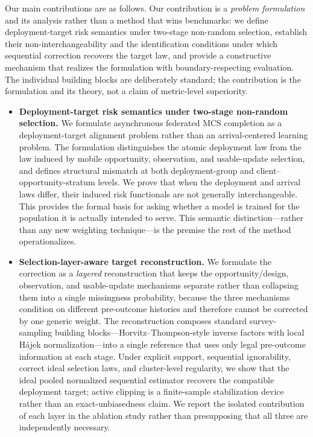 \documentclass[letterpaper,journal]{IEEEtran}
\begin{document}
Our main contributions are as follows.  Our contribution is a \emph{problem
formulation} and its analysis rather than a method that wins benchmarks: we
define deployment-target risk semantics under two-stage non-random selection,
establish their non-interchangeability and the identification conditions under
which sequential correction recovers the target law, and provide a
constructive mechanism that realizes the formulation with boundary-respecting
evaluation.  The individual building blocks are deliberately standard; the
contribution is the formulation and its theory, not a claim of metric-level
superiority.

\begin{itemize}
    \item \textbf{Deployment-target risk semantics under two-stage non-random
    selection.}
    We formulate asynchronous federated MCS completion as a
    deployment-target alignment problem rather than an arrival-centered
    learning problem.  The formulation distinguishes the atomic deployment law
    from the law induced by mobile opportunity, observation, and usable-update
    selection, and defines structural mismatch at both deployment-group and
    client--opportunity-stratum levels.  We prove that when the deployment and
    arrival laws differ, their induced risk functionals are not generally
    interchangeable.  This provides the formal basis for asking whether a model
    is trained for the population it is actually intended to serve.  This
    semantic distinction---rather than any new weighting technique---is the
    premise the rest of the method operationalizes.

    \item \textbf{Selection-layer-aware target reconstruction.}
    We formulate the correction as a \emph{layered} reconstruction that keeps the
    opportunity/design, observation, and usable-update mechanisms separate
    rather than collapsing them into a single missingness probability, because
    the three mechanisms condition on different pre-outcome histories and
    therefore cannot be corrected by one generic weight.  The reconstruction
    composes standard survey-sampling building blocks---Horvitz--Thompson-style
    inverse factors with local H\'ajek normalization---into a single reference
    that uses only legal pre-outcome information at each stage.  Under explicit
    support, sequential ignorability, correct ideal selection laws, and
    cluster-level regularity, we show that the ideal pooled normalized
    sequential estimator recovers the compatible deployment target; active
    clipping is a finite-sample stabilization device rather than an
    exact-unbiasedness claim.  We report the isolated contribution of each layer
    in the ablation study rather than presupposing that all three are
    independently necessary.


\end{itemize}
\end{document}
